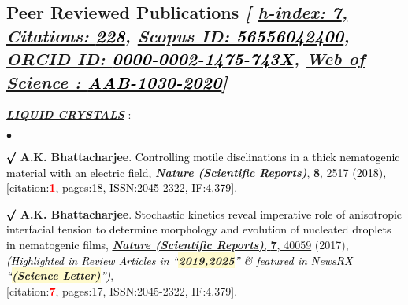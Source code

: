 \documentclass[margin,line]{res}
\newenvironment{list1}{
  \begin{list}{\ding{113}}{%
      \setlength{\itemsep}{0in}
      \setlength{\parsep}{0in} \setlength{\parskip}{0in}
      \setlength{\topsep}{0in} \setlength{\partopsep}{0in} 
      \setlength{\leftmargin}{0.17in}}}{\end{list}}
\newenvironment{list2}{
  \begin{list}{$\bullet$}{%
      \setlength{\itemsep}{0in}
      \setlength{\parsep}{0in} \setlength{\parskip}{0in}
      \setlength{\topsep}{0in} \setlength{\partopsep}{0in} 
      \setlength{\leftmargin}{0.2in}}}{\end{list}}
\begin{document}
\begin{resume}
\section{\sc Peer Reviewed Publications {\it [
\href{https://scholar.google.co.uk/citations?user=IE-ZhScAAAAJ}{h-index: \textcolor{black}{\bf 7}, 
Citations: \textcolor{black}{\bf 228}}, 
\href{https://www.scopus.com/authid/detail.uri?authorId=56556042400}{Scopus ID: \textcolor{black}{\bf 56556042400}}, 
\href{http://orcid.org/0000-0002-1475-743X}{ORCID ID: \textcolor{black}{\bf 0000-0002-1475-743X}}, 
\href{https://publons.com/researcher/3324830/amit-kumar-bhattacharjee}{Web of Science : \textcolor{black}{\bf AAB-1030-2020}}]}}
\begin{list1}
\item[] \textcolor{alizarin}{\ul{\textbf{\textit{LIQUID CRYSTALS}}} :}
\end{list1}
\vspace{2mm}
\begin{list2}
\item[$\pmb\surd$] {\bf A.K. Bhattacharjee}. \textcolor{black}{\textsf{Controlling motile disclinations in a thick  
nematogenic material with an electric field}, \href{https://www.nature.com/articles/s41598-018-19891-0}{\underline{\textbf{\textit{Nature 
(Scientific Reports)}}}, {\bf 8}, 2517} (2018), \\{[citation:\textcolor{red}{\bf 1}, pages:18, ISSN:2045-2322, IF:4.379]}}. 
\vspace{4mm}
\item[$\pmb\surd$] {\bf A.K. Bhattacharjee}. \textcolor{black}{\textsf{Stochastic kinetics reveal imperative role of anisotropic interfacial 
tension to determine morphology and evolution of nucleated droplets in nematogenic films}}, \href{https://www.nature.com/articles/srep40059}{\underline{\textit{\textbf{Nature (Scientific Reports)}}}, {\bf 7}, 40059} (2017),
\textcolor{black}{\small \it(Highlighted in Review Articles in ``\href{http://www.tandfonline.com/doi/abs/10.1080/02678292.2016.1239772}{\colorbox{lemonchiffon}{\bf 2019,}}\href{https://iopscience.iop.org/article/10.1088/1361-6633/adb441/meta}{\colorbox{lemonchiffon}{\bf 2025}}'' \& featured in NewsRX 
``\href{http://info.newsrx.com/hubfs/Corresponding\ Author\ Email\ Campaigns/Science\ Letter\ 02.03.17.pdf}{\colorbox{lemonchiffon}{\bf (Science Letter)}''})}, \\{[citation:\textcolor{red}{\bf 7}, pages:17, ISSN:2045-2322, IF:4.379]}.  

\end{list2}
\end{resume}
\end{document}
